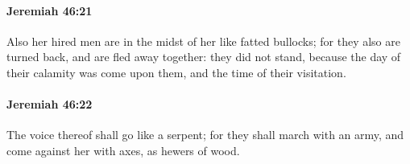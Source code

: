 		\paragraph{Jeremiah 46:21} %
			\label{JEREMIAH-46-21}

			Also her hired men are in the midst of her like fatted bullocks; for they also are turned back, and are fled away together: they did not stand, because the day of their calamity was come upon them, and the time of their visitation.


		\paragraph{Jeremiah 46:22} %
			\label{JEREMIAH-46-22}

			The voice thereof shall go like a serpent; for they shall march with an army, and come against her with axes, as hewers of wood.

